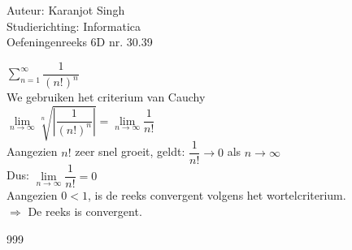 \documentclass[a4paper]{article}
\newcommand{\llim}{\lim\limits}
\begin{document}
\noindent \large Auteur: Karanjot Singh \\
\noindent \large Studierichting: Informatica \\
\noindent \large Oefeningenreeks 6D nr. 30.39 \\

\normalsize

$\displaystyle\sum\limits_{n=1}^\infty \dfrac{1}{(n!)^n}$ \\

We gebruiken het criterium van Cauchy\\

$\llim_{n \to \infty} \sqrt[n]{\left| \dfrac{1}{(n!)^n} \right|} = \llim_{n \to \infty} \dfrac{1}{n!}$ \\

Aangezien $n!$ zeer snel groeit, geldt: $\dfrac{1}{n!} \to 0$ als $n \to \infty$ \\

Dus: $\llim_{n \to \infty} \dfrac{1}{n!} = 0$ \\

Aangezien $0 < 1$, is de reeks convergent volgens het wortelcriterium. \\

$\Rightarrow$ De reeks is convergent. \\

\begin{thebibliography}{999}
\end{thebibliography}
\end{document}
